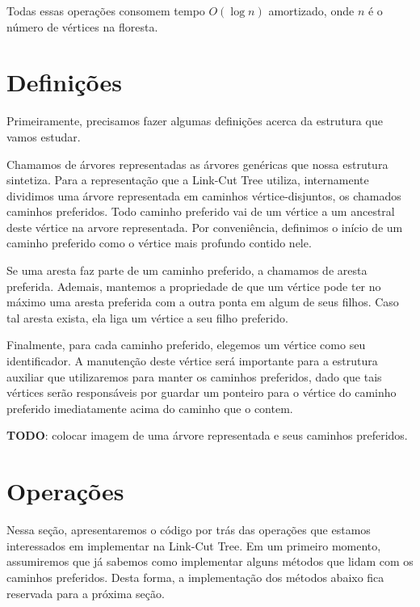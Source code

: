Todas essas operações consomem tempo $O(\log n)$ amortizado, onde $n$ é o número de vértices na floresta.

\section{Definições}
\label{sec:lct-definicoes}

Primeiramente, precisamos fazer algumas definições acerca da estrutura que vamos estudar.

Chamamos de árvores representadas as árvores genéricas que nossa estrutura sintetiza. Para a representação que a Link-Cut Tree utiliza, internamente dividimos uma árvore representada em caminhos vértice-disjuntos, os chamados caminhos preferidos. Todo caminho preferido vai de um vértice a um ancestral deste vértice na arvore representada. Por conveniência, definimos o início de um caminho preferido como o vértice mais profundo contido nele.

Se uma aresta faz parte de um caminho preferido, a chamamos de aresta preferida. Ademais, mantemos a propriedade de que um vértice pode ter no máximo uma aresta preferida com a outra ponta em algum de seus filhos. Caso tal aresta exista, ela liga um vértice a seu filho preferido.

Finalmente, para cada caminho preferido, elegemos um vértice como seu identificador. A manutenção deste vértice será importante para a estrutura auxiliar que utilizaremos para manter os caminhos preferidos, dado que tais vértices serão responsáveis por guardar um ponteiro para o vértice do caminho preferido imediatamente acima do caminho que o contem.

\begin{center}
    \textbf{TODO}: colocar imagem de uma árvore representada e seus caminhos preferidos.
\end{center}

\section{Operações}
\label{sec:lct-operacoes}

Nessa seção, apresentaremos o código por trás das operações que estamos interessados em implementar na Link-Cut Tree. Em um primeiro momento, assumiremos que já sabemos como implementar alguns métodos que lidam com os caminhos preferidos. Desta forma, a implementação dos métodos abaixo fica reservada para a próxima seção.

